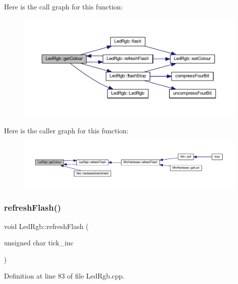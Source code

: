 Here is the call graph for this function\+:
\nopagebreak
\begin{figure}[H]
\begin{center}
\leavevmode
\includegraphics[width=350pt]{class_led_rgb_a542e3bf6bcf1f05df3cc442522787948_cgraph}
\end{center}
\end{figure}
Here is the caller graph for this function\+:
\nopagebreak
\begin{figure}[H]
\begin{center}
\leavevmode
\includegraphics[width=350pt]{class_led_rgb_a542e3bf6bcf1f05df3cc442522787948_icgraph}
\end{center}
\end{figure}
\mbox{\label{class_led_rgb_a31cf89e0117af309c00a60a7ca1bf486}} 
\subsubsection{\texorpdfstring{refresh\+Flash()}{refreshFlash()}}
{\footnotesize\ttfamily void Led\+Rgb\+::refresh\+Flash (\begin{DoxyParamCaption}\item[{unsigned char}]{tick\+\_\+inc }\end{DoxyParamCaption})}



Definition at line 83 of file Led\+Rgb.\+cpp.

